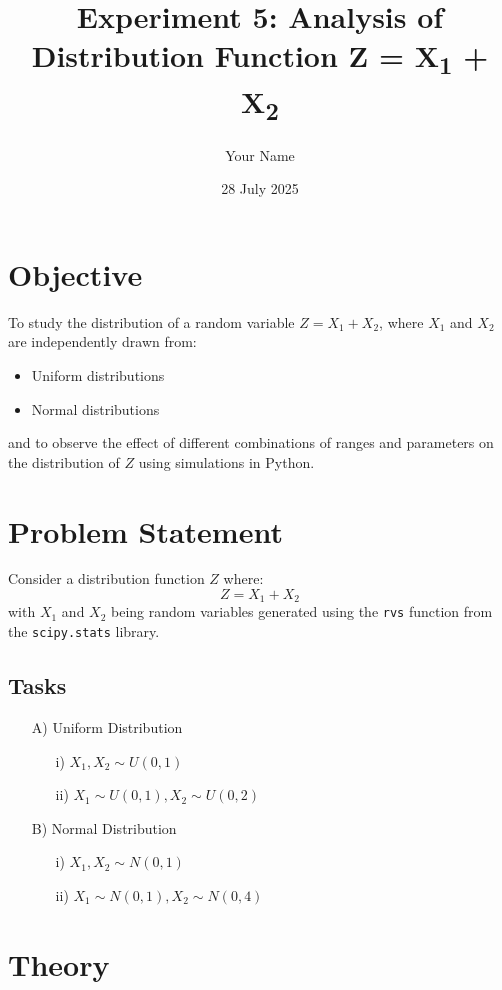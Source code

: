 \documentclass[12pt]{article}
\title{\textbf{Experiment 5: Analysis of Distribution Function Z = X\textsubscript{1} + X\textsubscript{2}}}
\author{Your Name}
\date{28 July 2025}
\begin{document}
\maketitle

\section*{Objective}
To study the distribution of a random variable \( Z = X_1 + X_2 \), where \( X_1 \) and \( X_2 \) are independently drawn from:
\begin{itemize}
  \item Uniform distributions
  \item Normal distributions
\end{itemize}
and to observe the effect of different combinations of ranges and parameters on the distribution of \( Z \) using simulations in Python.

\section*{Problem Statement}
Consider a distribution function \( Z \) where:
\[
Z = X_1 + X_2
\]
with \( X_1 \) and \( X_2 \) being random variables generated using the \texttt{rvs} function from the \texttt{scipy.stats} library.

\subsection*{Tasks}
\begin{enumerate}
  \item[A)] Uniform Distribution
    \begin{enumerate}
      \item[i)] \( X_1, X_2 \sim U(0, 1) \)
      \item[ii)] \( X_1 \sim U(0, 1), X_2 \sim U(0, 2) \)
    \end{enumerate}
  \item[B)] Normal Distribution
    \begin{enumerate}
      \item[i)] \( X_1, X_2 \sim N(0, 1) \)
      \item[ii)] \( X_1 \sim N(0, 1), X_2 \sim N(0, 4) \)
    \end{enumerate}
\end{enumerate}

\section*{Theory}
\end{document}
